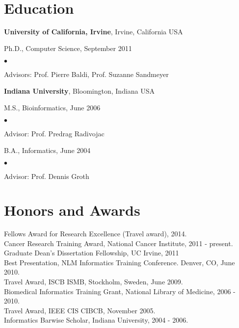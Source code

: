 \documentclass[margin,line]{res}
\newenvironment{list1}{
  \begin{list}{\ding{113}}{%
      \setlength{\itemsep}{0in}
      \setlength{\parsep}{0in} \setlength{\parskip}{0in}
      \setlength{\topsep}{0in} \setlength{\partopsep}{0in} 
      \setlength{\leftmargin}{0.17in}}}{\end{list}}
\newenvironment{list2}{
  \begin{list}{$\bullet$}{%
      \setlength{\itemsep}{0in}
      \setlength{\parsep}{0in} \setlength{\parskip}{0in}
      \setlength{\topsep}{0in} \setlength{\partopsep}{0in} 
      \setlength{\leftmargin}{0.2in}}}{\end{list}}
\begin{document}
\begin{resume}
\section{\sc Education}
        {\bf University of California, Irvine}, Irvine, California USA\\
        \vspace*{-.1in}
        \begin{list1}
        \item[] Ph.D., Computer Science, September 2011
          \begin{list2}
            \vspace*{.025in}
          \item Advisors: Prof. Pierre Baldi, Prof. Suzanne Sandmeyer
          \end{list2}
        \end{list1}
        {\bf Indiana University}, Bloomington, Indiana USA\\
        \vspace*{-.1in}
        \begin{list1}
        \item[] M.S., Bioinformatics, June 2006
          \begin{list2}
            \vspace*{.05in}
          \item Advisor: Prof. Predrag Radivojac
          \end{list2}
          \vspace*{.05in}
        \item[] B.A., Informatics, June 2004           
          \begin{list2}
            \vspace*{.05in}
          \item Advisor: Prof. Dennis Groth
          \end{list2}
        \end{list1}
                  
        \section{\sc Honors and Awards} 
        Fellows Award for Research Excellence (Travel award), 2014. \\
        Cancer Research Training Award, National Cancer Institute, 2011 - present.\\
        Graduate Dean’s Dissertation Fellowship, UC Irvine, 2011\\
        Best Presentation, NLM Informatics Training Conference. Denver, CO, June 2010.\\
        Travel Award, ISCB ISMB, Stockholm, Sweden, June 2009.\\
        Biomedical Informatics Training Grant, National Library of Medicine, 2006 - 2010.\\
        Travel Award, IEEE CIS CIBCB, November 2005.\\ %
        Informatics Barwise Scholar, Indiana University, 2004 - 2006.


\end{resume}
\end{document}
